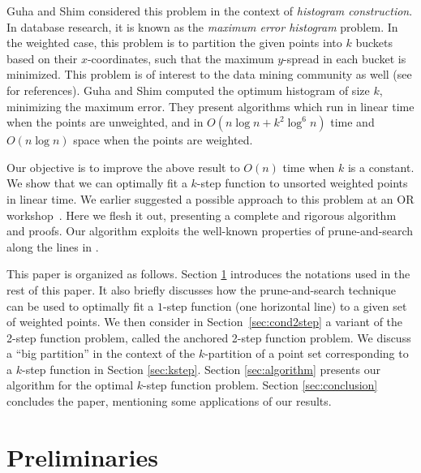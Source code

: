 \documentclass[preprint,10pt]{elsarticle}
\begin{document}
Guha and Shim \cite{guha2007} considered this problem in the context of {\em histogram construction}.
In database research, it is known as the {\em maximum error histogram} problem.
In the weighted case,
 this problem is to partition the given points into $k$ buckets based on their $x$-coordinates,
such that the maximum $y$-spread in each bucket is minimized.
This problem is of interest to the data mining community as well (see \cite{guha2007} for references).
Guha and Shim \cite{guha2007} computed the optimum histogram of size $k$,
minimizing the maximum error.
They present algorithms which run in linear time when the points are unweighted,
and in $O(n\log n + k^2\log^6n)$ time and $O(n\log n)$ space when the points are weighted.

Our objective is to improve the above result to $O(n)$ time when $k$ is a constant.
We show that we can optimally fit a $k$-step function to unsorted weighted points in linear time.
We earlier suggested a possible approach to this problem at an OR workshop~\cite{bhattacharya2013b}.
Here we flesh it out, presenting a complete and rigorous algorithm and proofs.
Our algorithm exploits the well-known properties of prune-and-search along the lines in \cite{bhattacharya2007}.


This paper is organized as follows.
Section \ref{sec:prelim} introduces the notations used in the rest of this paper.
It also briefly discusses how the prune-and-search technique can be used
to optimally fit a $1$-step function (one horizontal line) to a given set of weighted points.
We then consider in Section~\ref{sec:cond2step} a variant of the 2-step function problem,
called the anchored 2-step function problem.
We discuss a ``big partition'' in the context of the $k$-partition of a point set
corresponding to a $k$-step function in Section \ref{sec:kstep}.
Section \ref{sec:algorithm} presents our algorithm for the optimal $k$-step function problem.
Section \ref{sec:conclusion} concludes the paper,
mentioning some applications of our results.



\section{Preliminaries}\label{sec:prelim}
\end{document}

